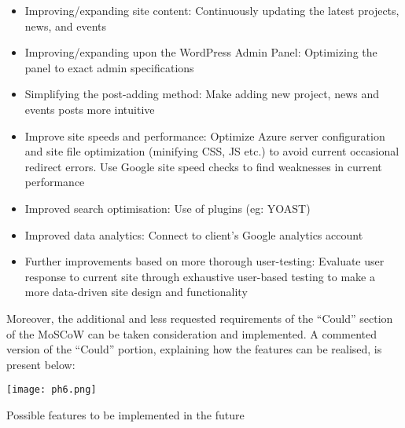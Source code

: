 \documentclass[fontsize=11pt]{extarticle}
\numberwithin{figure}{section} %
\providecommand{\tightlist}{%
  \setlength{\itemsep}{0pt}\setlength{\parskip}{0pt}}
\begin{document}
\begin{itemize}
\tightlist
\item
  Improving/expanding site content: Continuously updating the latest
  projects, news, and events
\item
  Improving/expanding upon the WordPress Admin Panel: Optimizing the
  panel to exact admin specifications
\item
  Simplifying the post-adding method: Make adding new project, news and
  events posts more intuitive
\item
  Improve site speeds and performance: Optimize Azure server
  configuration and site file optimization (minifying CSS, JS etc.) to
  avoid current occasional redirect errors. Use Google site speed checks
  to find weaknesses in current performance
\item
  Improved search optimisation: Use of plugins (eg: YOAST)
\item
  Improved data analytics: Connect to client's Google analytics account
\item
  Further improvements based on more thorough user-testing: Evaluate
  user response to current site through exhaustive user-based testing to
  make a more data-driven site design and functionality
\end{itemize}

Moreover, the additional and less requested requirements of the
``Could'' section of the MoSCoW can be taken consideration and
implemented. A commented version of the ``Could'' portion, explaining
how the features can be realised, is present below:

\begin{table}[H]
      \centering
      \texttt{[image: ph6.png]}
      \caption{Possible features to be implemented in the future}
 \end{table}
\newpage

% 
\end{document}
